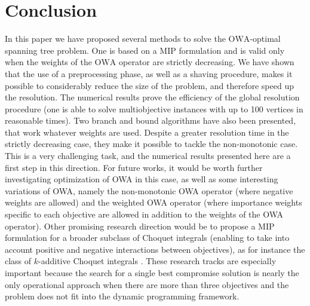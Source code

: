 \documentclass[final,3p,times]{elsarticle}
\newcommand{\owa}{\mbox{OWA}}
\begin{document}
\section{Conclusion}

In this paper we have proposed several methods to solve the
$\owa$-optimal spanning tree problem. One is based on a MIP
formulation and is valid only when the weights of the $\owa$ operator
are strictly decreasing. We have shown that the use of a preprocessing
phase, as well as a shaving procedure, makes it possible to
considerably reduce the size of the problem, and therefore speed up
the resolution. The numerical results prove the efficiency of the global resolution procedure (one is able to solve multiobjective instances with up to 100 vertices in reasonable times). Two branch and bound algorithms have also been
presented, that work whatever weights are used. Despite a greater resolution time in the strictly decreasing case, they make it possible to tackle the non-monotonic case. This is a very challenging task, and the numerical results presented here are a first step in this direction. For future works, it would be worth further investigating optimization of OWA in this case, as well as some interesting variations of OWA, namely the non-monotonic OWA operator \cite{Yager99} (where negative
weights are allowed) and the weighted OWA operator \cite{Torra97}
(where importance weights specific to each objective are allowed in
addition to the weights of the OWA operator). Other promising research
direction would be to propose a MIP formulation for a broader subclass
of Choquet integrals (enabling to take into account positive and
negative interactions between objectives), as for instance the class of
$k$-additive Choquet integrals \cite{Grabi97}. These research tracks
are especially important because the search for a single best
compromise solution is nearly the only operational approach when there
are more than three objectives and the problem does not fit into
the dynamic programming framework. 








         
\end{document}
